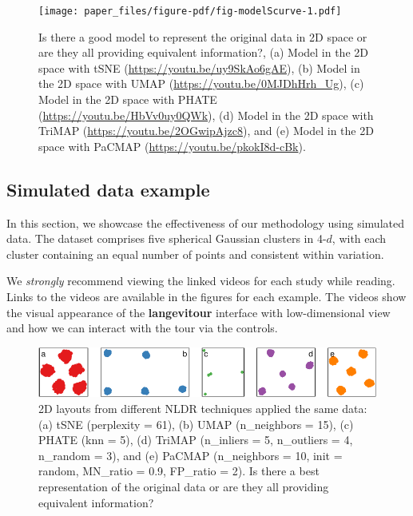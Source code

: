 \documentclass[
  12pt]{article}
\begin{document}
\begin{figure}

{\centering \texttt{[image: paper\_files/figure-pdf/fig-modelScurve-1.pdf]}

}

\caption{\label{fig-modelScurve}Is there a good model to represent the
original data in 2D space or are they all providing equivalent
information?, (a) Model in the 2D space with tSNE
(\url{https://youtu.be/uy9SkAo6gAE}), (b) Model in the 2D space with
UMAP (\url{https://youtu.be/0MJDhHrh_Ug}), (c) Model in the 2D space
with PHATE (\url{https://youtu.be/HbVv0uy0QWk}), (d) Model in the 2D
space with TriMAP (\url{https://youtu.be/2OGwipAjzc8}), and (e) Model in
the 2D space with PaCMAP (\url{https://youtu.be/pkokI8d-cBk}).}

\end{figure}

\hypertarget{sec-simpleex}{%
\subsection{Simulated data example}\label{sec-simpleex}}

In this section, we showcase the effectiveness of our methodology using
simulated data. The dataset comprises five spherical Gaussian clusters
in 4-\(d\), with each cluster containing an equal number of points and
consistent within variation.

We \emph{strongly} recommend viewing the linked videos for each study
while reading. Links to the videos are available in the figures for each
example. The videos show the visual appearance of the
\textbf{langevitour} interface with low-dimensional view and how we can
interact with the tour via the controls.

\begin{figure}

{\centering \includegraphics[width=1\textwidth,height=\textheight]{paper_files/figure-pdf/fig-nldervis5Gau-1.pdf}

}

\caption{\label{fig-nldervis5Gau}2D layouts from different NLDR
techniques applied the same data: (a) tSNE (perplexity = 61), (b) UMAP
(n\_neighbors = 15), (c) PHATE (knn = 5), (d) TriMAP (n\_inliers = 5,
n\_outliers = 4, n\_random = 3), and (e) PaCMAP (n\_neighbors = 10, init
= random, MN\_ratio = 0.9, FP\_ratio = 2). Is there a best
representation of the original data or are they all providing equivalent
information?}

\end{figure}
\end{document}
